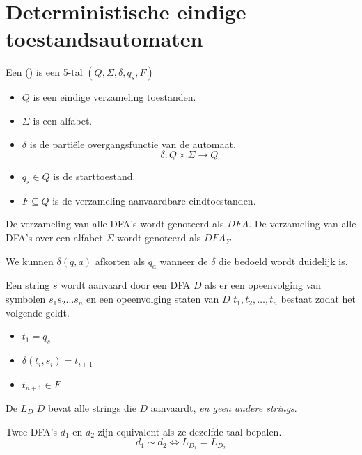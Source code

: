 \documentclass[main.tex]{subfiles}
\begin{document}
\section{Deterministische eindige toestandsautomaten}
\begin{de}
  Een  () is een 5-tal $(Q,\Sigma,\delta,q_{s},F)$
  \begin{itemize}
  \item $Q$ is een eindige verzameling toestanden.
  \item $\Sigma$ is een alfabet.
  \item $\delta$ is de parti\"ele overgangsfunctie van de automaat.
  \[ \delta: Q \times \Sigma \rightarrow Q \]
  \item $q_{s} \in Q$ is de starttoestand.
  \item $F \subseteq Q$ is de verzameling aanvaardbare eindtoestanden.
  \end{itemize}
\end{de}

\begin{de}
  De verzameling van alle DFA's wordt genoteerd als $DFA$.
  De verzameling van alle DFA's over een alfabet $\Sigma$ wordt genoteerd als $DFA_{\Sigma}$.
\end{de}

\begin{de}
  We kunnen $\delta(q,a)$ afkorten als $q_{a}$ wanneer de $\delta$ die bedoeld wordt duidelijk is.  
\end{de}

\begin{de}
  Een string $s$ wordt aanvaard door een DFA $D$ als er een opeenvolging van symbolen $s_{1}s_{2}\dotsc s_{n}$ en een opeenvolging staten van $D$ $t_{1},t_{2},\dotsc,t_{n}$ bestaat zodat het volgende geldt.
  \begin{itemize}
  \item $t_{1} = q_{s}$
  \item $\delta(t_{i},s_{i}) = t_{i+1}$
  \item $t_{n+1} \in F$
  \end{itemize}
\end{de}

\begin{de}
  De  $L_{D}$  $D$ bevat alle strings die $D$ aanvaardt, \textit{en geen andere strings}.
\end{de}

\begin{de}
  Twee DFA's $d_{1}$ en $d_{2}$ zijn equivalent als ze dezelfde taal bepalen.
  \[ d_{1} \sim d_{2} \Leftrightarrow L_{D_{1}} = L_{D_{2}} \]
\end{de}
\end{document}
